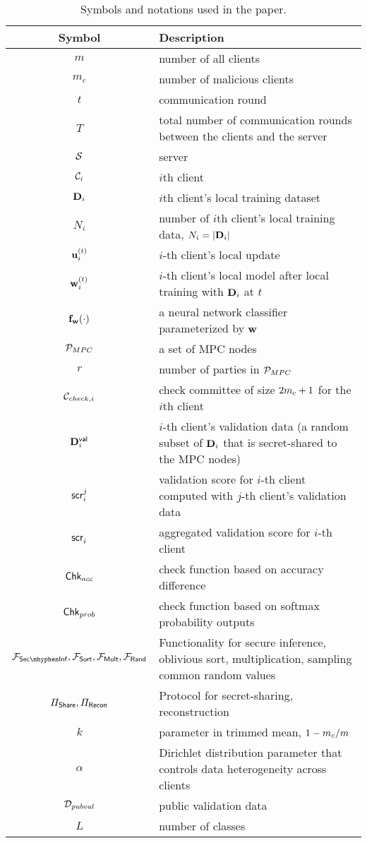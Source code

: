 \begin{table}[h]
\begin{adjustbox}{width=\textwidth,center}
\centering
\begin{tabular}{c|l}
\toprule
Symbol  & Description \\ \hline\hline
$m$ & number of all clients \\
$m_c$ & number of malicious clients \\
$t$ & communication round \\
$T$ & total number of communication rounds between the clients and the server \\
$\calS$ & server \\
$\calC_i$ & $i$th client \\
$\bfD_i$ & $i$th client's local training dataset \\
$N_i$ & number of $i$th client's local training data, $N_i = |\bfD_i|$ \\
$\bfu_i^{(t)}$ & $i$-th client's local update \\
$\bfw_i^{(t)}$ & $i$-th client's local model after local training with $\bfD_i$ at $t$ \\
$\bff_{\bfw}(\cdot)$ & a neural network classifier parameterized by $\bfw$ \\
$\mpcnodes$ & a set of MPC nodes \\
$r$ & number of parties in $\mpcnodes$ \\
$\calC_{check, i}$ & check committee of size $2\cor + 1$ for the $i$th client \\
$\bfD^{\msf{val}}_i$ & $i$-th client's validation data (a random subset of $\bfD_i$ that is secret-shared to the MPC nodes) \\
$\score{i}{j}$ & validation score for $i$-th client computed with $j$-th client's validation data\\
$\score{i}{}$ & aggregated validation score for $i$-th client\\
$\msf{Chk}_{acc}$ & check function based on accuracy difference \\
$\msf{Chk}_{prob}$ & check function based on softmax probability outputs \\
$\FSecInf, \FSort, \FMult, \FRand$ & Functionality for secure inference, oblivious sort, multiplication, sampling common random values \\
$\PShare, \PRec$ & Protocol for secret-sharing, reconstruction \\
$k$ & parameter in trimmed mean, $1 - \cor/m$ \\
$\alpha$ & Dirichlet distribution parameter that controls data heterogeneity across clients \\
$\calD_{pubval}$ & public validation data \\
$L$ & number of classes \\

\bottomrule
\end{tabular}
\end{adjustbox}
\caption{Symbols and notations used in the paper. }
\label{tab:notations}
\end{table}
